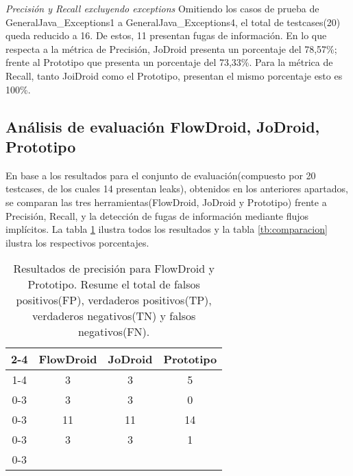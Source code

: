 \textit{Precisión y Recall excluyendo exceptions}\newline
Omitiendo los casos de prueba de GeneralJava\_Exceptions1 a
GeneralJava\_Exceptions4, el total de testcases(20) queda reducido a 16. De
estos, 11 presentan fugas de información.\newline
En lo que respecta a la métrica de Precisión, JoDroid
presenta un porcentaje del 78,57\%; frente al Prototipo que presenta un
porcentaje del 73,33\%.\newline 
Para la métrica de Recall, tanto JoiDroid como el Prototipo, presentan el mismo
porcentaje esto es 100\%.\newline



\subsection{Análisis de evaluación FlowDroid, JoDroid, Prototipo}
\label{subsec:fjp}

En base a los resultados para el conjunto de
evaluación(compuesto por 20 testcases, de los cuales 14 presentan leaks),
obtenidos en los anteriores apartados, 
se comparan las tres herramientas(FlowDroid, JoDroid y Prototipo) frente a
Precisión, Recall, y la detección de fugas de información mediante flujos
implícitos. La tabla \ref{tb:porcentajes} ilustra todos los resultados y la
tabla \ref{tb:comparacion} ilustra los respectivos porcentajes.

\begin{table}[t!]
\begin{center}
\begin{tabular}{c|c|c|c|}
\cline{2-4}
& \cellcolor{gray!30}FlowDroid & \cellcolor{gray!30}JoDroid &
\cellcolor{gray!30}Prototipo \\
\cline{1-4}
\multicolumn{0}{ |c|  }{\multirow{0}{*}{FP} }  & 3 & 3 & 5\\ \cline{0-3}
\multicolumn{0}{ |c|  }{\multirow{0}{*}{FN} }  & 3 & 3 & 0\\ \cline{0-3}
\multicolumn{0}{ |c|  }{\multirow{0}{*}{TP} }  & 11 & 11 & 14\\\cline{0-3}
\multicolumn{0}{ |c|  }{\multirow{0}{*}{TN} }  & 3 & 3 &  1\\ \cline{0-3}
\end{tabular}
\end{center}
\caption{Resultados de precisión para FlowDroid y Prototipo. Resume el total de
falsos positivos(FP), verdaderos positivos(TP), verdaderos negativos(TN) y
falsos negativos(FN).}
\label{tb:porcentajes}
\end{table}

